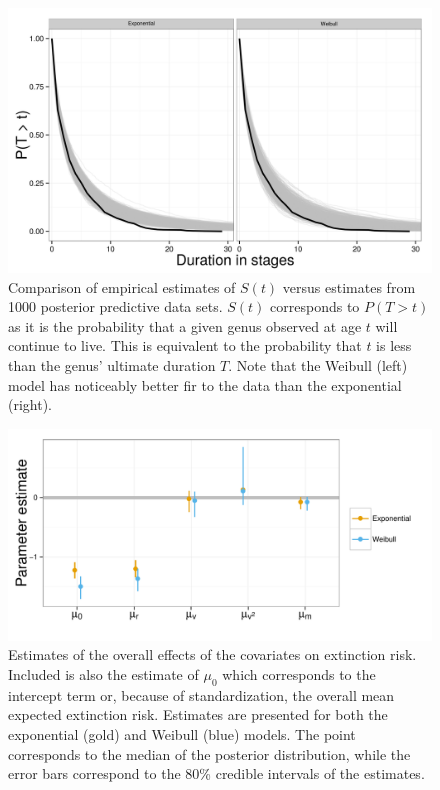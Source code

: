 \documentclass[12pt,letterpaper]{article}
\begin{document}
\begin{figure}[ht]
  \centering
  \includegraphics[height = 0.5\textheight,width=\textwidth,keepaspectratio=true]{figure/survival_curves}
  \caption{Comparison of empirical estimates of \(S(t)\) versus estimates from 1000 posterior predictive data sets. \(S(t)\) corresponds to \(P(T > t)\) as it is the probability that a given genus observed at age \(t\) will continue to live. This is equivalent to the probability that \(t\) is less than the genus' ultimate duration \(T\). Note that the Weibull (left) model has noticeably better fir to the data than the exponential (right).}
  \label{fig:surv}
\end{figure}

\begin{figure}[ht]
  \centering
  \includegraphics[height = 0.5\textheight,width=\textwidth,keepaspectratio=true]{figure/coef_means}
  \caption{Estimates of the overall effects of the covariates on extinction risk. Included is also the estimate of \(\mu_{0}\) which corresponds to the intercept term or, because of standardization, the overall mean expected extinction risk. Estimates are presented for both the exponential (gold) and Weibull (blue) models. The point corresponds to the median of the posterior distribution, while the error bars correspond to the 80\% credible intervals of the estimates.}
  \label{fig:mu}
\end{figure}
\end{document}
